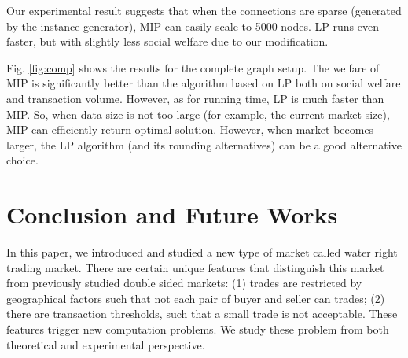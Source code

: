 \documentclass{aamas2015}
\begin{document}
%

Our experimental result suggests that when the connections are sparse (generated by the instance generator), MIP can easily scale to 5000 nodes. LP runs even faster, but with slightly less social welfare due to our modification.

Fig. \ref{fig:comp} shows the results for the complete graph setup.
The welfare of MIP is significantly better than the algorithm based on LP both on social welfare and transaction volume.
However, as for running time, LP is much faster than MIP.
So, when data size is not too large (for example, the current market size), MIP can efficiently return optimal solution.
However, when market becomes larger, the LP algorithm (and its rounding alternatives) can be a good alternative choice.


\section{Conclusion and Future Works}
In this paper, we introduced and studied a new type of market called water right trading market. There are certain unique features that distinguish this market from previously studied double sided markets: (1) trades are restricted by geographical factors such that not each pair of buyer and seller can trades; (2) there are transaction thresholds, such that a small trade is not acceptable. These features trigger new computation problems. We study these problem from both theoretical and experimental perspective.
\end{document}
